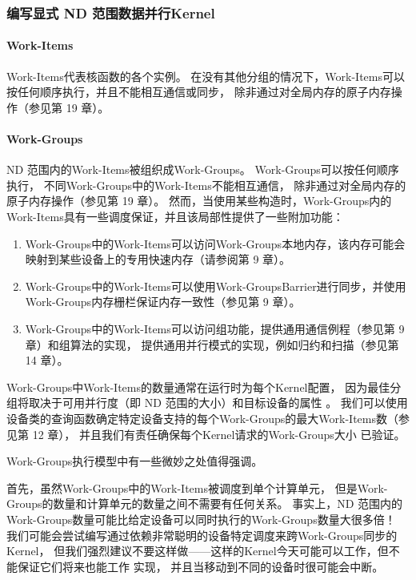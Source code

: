 \subsubsection{编写显式 ND 范围数据并行Kernel}
\paragraph{Work-Items}

Work-Items代表核函数的各个实例。 
在没有其他分组的情况下，Work-Items可以按任何顺序执行，并且不能相互通信或同步，
除非通过对全局内存的原子内存操作（参见第 19 章）。

\paragraph{Work-Groups}

ND 范围内的Work-Items被组织成Work-Groups。 Work-Groups可以按任何顺序执行，
不同Work-Groups中的Work-Items不能相互通信，
除非通过对全局内存的原子内存操作（参见第 19 章）。 
然而，当使用某些构造时，Work-Groups内的Work-Items具有一些调度保证，并且该局部性提供了一些附加功能：

\begin{enumerate}
	\item Work-Groups中的Work-Items可以访问Work-Groups本地内存，该内存可能会映射到某些设备上的专用快速内存（请参阅第 9 章）。

	\item Work-Groups中的Work-Items可以使用Work-GroupsBarrier进行同步，并使用Work-Groups内存栅栏保证内存一致性（参见第 9 章）。

	\item Work-Groups中的Work-Items可以访问组功能，提供通用通信例程（参见第 9 章）和组算法的实现，
	提供通用并行模式的实现，例如归约和扫描（参见第 14 章）。
\end{enumerate}

Work-Groups中Work-Items的数量通常在运行时为每个Kernel配置，
因为最佳分组将取决于可用并行度（即 ND 范围的大小）和目标设备的属性 。 
我们可以使用设备类的查询函数确定特定设备支持的每个Work-Groups的最大Work-Items数（参见第 12 章），
并且我们有责任确保每个Kernel请求的Work-Groups大小 已验证。

Work-Groups执行模型中有一些微妙之处值得强调。

首先，虽然Work-Groups中的Work-Items被调度到单个计算单元，
但是Work-Groups的数量和计算单元的数量之间不需要有任何关系。 
事实上，ND 范围内的Work-Groups数量可能比给定设备可以同时执行的Work-Groups数量大很多倍！ 
我们可能会尝试编写通过依赖非常聪明的设备特定调度来跨Work-Groups同步的Kernel，
但我们强烈建议不要这样做——这样的Kernel今天可能可以工作，但不能保证它们将来也能工作 实现，
并且当移动到不同的设备时很可能会中断。

